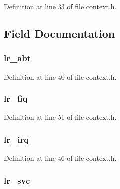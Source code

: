 \-Definition at line 33 of file context.\-h.



\subsection{\-Field \-Documentation}
\hypertarget{structarch__regs__banked_a849c08959c26885f666f8adfae89aaf9}{
\subsubsection[{lr\-\_\-abt}]{ {\bf lr\-\_\-abt}}}\label{structarch__regs__banked_a849c08959c26885f666f8adfae89aaf9}


\-Definition at line 40 of file context.\-h.

\hypertarget{structarch__regs__banked_a969afbee21b8eeb5325d9093d42fb085}{
\subsubsection[{lr\-\_\-fiq}]{ {\bf lr\-\_\-fiq}}}\label{structarch__regs__banked_a969afbee21b8eeb5325d9093d42fb085}


\-Definition at line 51 of file context.\-h.

\hypertarget{structarch__regs__banked_a40c4ed1151aa96baf0123e142db7fd5c}{
\subsubsection[{lr\-\_\-irq}]{ {\bf lr\-\_\-irq}}}\label{structarch__regs__banked_a40c4ed1151aa96baf0123e142db7fd5c}


\-Definition at line 46 of file context.\-h.

\hypertarget{structarch__regs__banked_a4e9874b76913bbabf160a5a855581bbc}{
\subsubsection[{lr\-\_\-svc}]{ {\bf lr\-\_\-svc}}}\label{structarch__regs__banked_a4e9874b76913bbabf160a5a855581bbc}


